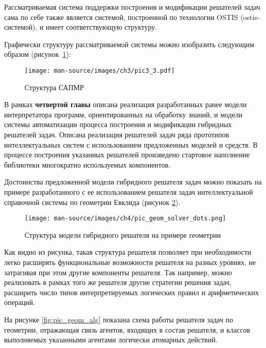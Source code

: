 \documentclass{thesisby}
\begin{document}
Рассматриваемая система поддержки построения и модификации решателей задач сама по себе также является системой, построенной по технологии OSTIS (ostis-системой), и имеет соответствующую структуру.

Графически структуру рассматриваемой системы можно изобразить следующим образом (рисунок~\ref{fig:pic3_3}):

\begin{figure}[H]
    \centering
    \texttt{[image: man-source/images/ch3/pic3\_3.pdf]}
    \caption{Структура САПМР}
    \label{fig:pic3_3}
\end{figure}

\vspace{-3mm}

В рамках \textbf{четвертой главы} описана реализация разработанных ранее модели интерпретатора программ, ориентированных на обработку знаний, и модели системы автоматизации процесса построения и модификации гибридных решателей задач. Описана реализация решателей задач ряда прототипов интеллектуальных систем с использованием предложенных моделей и средств. В процессе построения указанных решателей произведено стартовое наполнение библиотеки многократно используемых компонентов. 

Достоинства предложенной модели гибридного решателя задач можно показать на примере разработанного с ее использованием решателя задач интеллектуальной справочной системы по геометрии Евклида (рисунок \ref{fig:pic_geom_solver}).

\begin{figure}[H]
    \centering
    \texttt{[image: man-source/images/ch4/pic\_geom\_solver\_dots.png]}
    \caption{Структура модели гибридного решателя на примере геометрии}
    \label{fig:pic_geom_solver}
\end{figure}

\vspace{-3mm}

Как видно из рисунка, такая структура решателя позволяет при необходимости легко расширять функциональные возможности решателя на разных уровнях, не затрагивая при этом другие компоненты решателя. Так например, можно реализовать в рамках того же решателя другие стратегии решения задач, расширить число типов интерпретируемых логических правил и арифметических операций.


На рисунке \ref{fig:pic_geom_alg} показана схема работы решателя задач по геометрии, отражающая связь агентов, входящих в состав решателя, и классов выполняемых указанными агентами логически атомарных действий.
\end{document}
